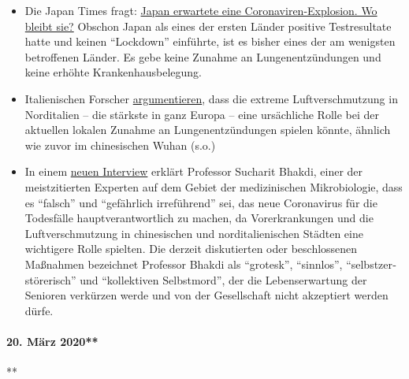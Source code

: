 \begin{itemize}
\tightlist
\item
  Die Japan Times fragt:
  \href{https://www.japantimes.co.jp/news/2020/03/20/national/coronavirus-explosion-expected-japan/}{Japan
  erwartete eine Coronaviren-Explosion. Wo bleibt sie?} Obschon Japan
  als eines der ersten Länder positive Testresultate hatte und keinen
  ``Lockdown'' einführte, ist es bisher eines der am wenigsten
  betroffenen Länder. Es gebe keine Zunahme an Lungen­ent­zündungen und
  keine erhöhte Krankenhausbelegung.
\item
  Italienischen Forscher
  \href{https://www.heise.de/tp/features/Feinstaubpartikel-als-Viren-Vehikel-4687454.html}{argumentieren},
  dass die extreme Luftverschmutzung in Norditalien -- die stärkste in
  ganz Europa -- eine ursächliche Rolle bei der aktuellen lokalen
  Zunahme an Lungenentzündungen spielen könnte, ähnlich wie zuvor im
  chinesischen Wuhan (s.o.)
\item
  In einem \href{https://www.youtube.com/watch?v=JBB9bA-gXL4}{neuen
  Interview} erklärt Professor Sucharit Bhakdi, einer der meistzitierten
  Experten auf dem Gebiet der medizinischen Mikrobiologie, dass es
  ``falsch'' und ``gefährlich irreführend'' sei, das neue Coronavirus
  für die Todesfälle haupt­ver­ant­wortlich zu machen, da
  Vorerkrankungen und die Luftverschmutzung in chinesischen und
  nord­ita­lie­nischen Städten eine wichtigere Rolle spielten. Die
  derzeit diskutierten oder beschlossenen Maßnahmen bezeichnet Professor
  Bhakdi als ``grotesk'', ``sinnlos'', ``selbstzer­stö­rerisch'' und
  ``kollektiven Selbstmord'', der die Lebens­erwartung der Senioren
  verkürzen werde und von der Gesellschaft nicht akzeptiert werden
  dürfe.
\end{itemize}

\hypertarget{20-muxe4rz-2020}{%
\paragraph{20. März 2020**}\label{20-muxe4rz-2020}}

**

